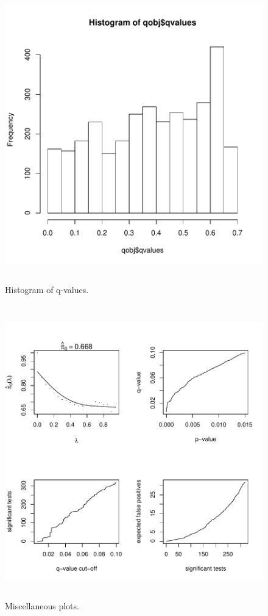 \documentclass[11pt]{article}
\begin{document}
\begin{figure}[ht]
  \begin{center}
    \includegraphics[width=5in,height=5in]{qHist}
  \end{center}
  \caption{Histogram of q-values.}
\end{figure}

\begin{figure}[ht]
  \begin{center}
    \includegraphics[width=5in,height=5in]{qPlots}
  \end{center}
  \caption{Miscellaneous plots.}
\end{figure}
\end{document}
